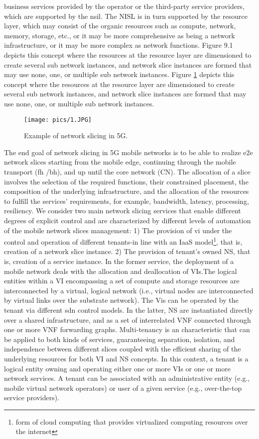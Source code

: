 \documentclass{article}
\begin{document}
business services provided by the operator or the third-party service providers,
which are supported by the \gls{nsil}. The NISL
is in turn supported by the resource layer, which may consist of the organic
resources such as compute, network, memory, storage, etc., or it may be more
comprehensive as being a network infrastructure, or it may be more complex
as network functions. Figure 9.1 depicts this concept where the resources at
the resource layer are dimensioned to create several sub network instances,
and network slice instances are formed that may use none, one, or multiple sub
network instances. Figure \ref{layers} depicts this concept where the resources at
the resource layer are dimensioned to create several sub network instances,
and network slice instances are formed that may use none, one, or multiple sub
network instances. 
\begin{figure}
\centering
\texttt{[image: pics/1.JPG]}
\label{layers}
\caption{Example of network slicing in 5G.} 
\end{figure}
The end goal of network slicing in 5G mobile networks is to be able to realize
\gls{e2e} network slices starting from the mobile edge, continuing
through the mobile transport (\gls{fh} /\gls{bh}), and up until
the core network (CN). The allocation of a slice involves the selection of the
required functions, their constrained placement, the composition of the underlying infrastructure, and the allocation of the resources to fulfill the services' requirements, for example, bandwidth, latency, processing, resiliency.
We consider two main network slicing services that enable different degrees
of explicit control and are characterized by different levels of automation of the
mobile network slices management:
1) The provision of \gls{vi} under the control and operation
of different tenants-in line with an \gls{IaaS} model\footnote{form of cloud computing that provides virtualized computing resources over the internet},
that is, creation of a network slice instance.
2) The provision of tenant's owned \gls{NS}, that is, creation of a service instance.
In the former service, the deployment of a mobile network deals with the
allocation and deallocation of VIs.The logical entities within a VI encompassing
a set of compute and storage resources are interconnected by a virtual, logical
network (i.e., virtual nodes are interconnected by virtual links over the substrate
network). The Vis can be operated by the tenant via different \gls{sdn} control
models. In the latter, NS are instantiated directly over a shared infrastructure,
and as a set of interrelated \gls{VNF} connected through
one or more VNF forwarding graphs.
Multi-tenancy is an characteristic that can be applied to both
kinds of services, guaranteeing separation, isolation, and independence between
different slices coupled with the efficient sharing of the underlying resources
for both VI and NS concepts. In this context, a tenant is a logical entity owning and operating either one or more VIs or one or more network services. A tenant can be associated with an administrative entity (e.g., mobile virtual network operators) or
user of a given service (e.g., over-the-top service providers).
\end{document}
